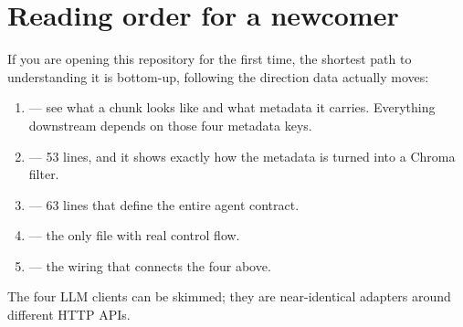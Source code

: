 \section{Reading order for a newcomer}

If you are opening this repository for the first time, the shortest path to understanding it is bottom-up, following the direction data actually moves:

\begin{enumerate}[leftmargin=*]
  \item {} --- see what a chunk looks like and what metadata it carries. Everything downstream depends on those four metadata keys.
  \item {} --- 53 lines, and it shows exactly how the metadata is turned into a Chroma  filter.
  \item {} --- 63 lines that define the entire agent contract.
  \item {} --- the only file with real control flow.
  \item {} --- the wiring that connects the four above.
\end{enumerate}

The four LLM clients can be skimmed; they are near-identical adapters around different HTTP APIs.
